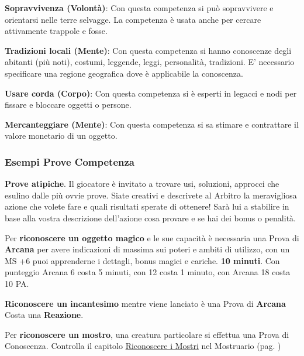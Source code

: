 \documentclass[12pt,a4paper,twoside,openany]{book}
\begin{document}
\begin{multicols}{2}
\textbf{Sopravvivenza (Volontà)}: Con questa competenza si può sopravvivere e orientarsi nelle terre selvagge. La competenza è usata anche per cercare attivamente trappole e fosse.

\textbf{Tradizioni locali (Mente)}: Con questa competenza si hanno conoscenze degli abitanti (più noti), costumi, leggende, leggi, personalità, tradizioni. E' necessario specificare una regione geografica dove è applicabile la conoscenza. 

\textbf{Usare corda (Corpo)}: Con questa competenza si è esperti in legacci e nodi per fissare e bloccare oggetti o persone. 

\textbf{Mercanteggiare (Mente)}: Con questa competenza si sa stimare e contrattare il valore monetario di un oggetto.

\subsubsection{Esempi Prove Competenza}\label{esempiprovecompetenza}\hypertarget{esempiprovecompetenze}{}

\textbf{Prove atipiche}. Il giocatore è invitato a trovare usi, soluzioni, approcci che esulino dalle più ovvie prove. Siate creativi e descrivete al Arbitro la meravigliosa azione che volete fare e quali risultati sperate di ottenere! Sarà lui a stabilire in base alla vostra descrizione dell'azione cosa provare e se hai dei bonus o penalità.

\medskip

Per \textbf{riconoscere un oggetto magico} e le sue capacità è necessaria una Prova di \textbf{Arcana} per avere indicazioni di massima sui poteri e ambiti di utilizzo, con un MS +6 puoi apprenderne i dettagli, bonus magici e cariche. \textbf{10 minuti}. Con punteggio Arcana 6 costa 5 minuti, con 12 costa 1 minuto, con Arcana 18 costa 10 PA.

\medskip

\textbf{Riconoscere un incantesimo} mentre viene lanciato è una Prova di \textbf{Arcana} Costa una \textbf{Reazione}.
\medskip

Per \textbf{riconoscere un mostro}, una creatura particolare si effettua una Prova di Conoscenza. Controlla il capitolo \hyperlink{riconoscereimostri}{Riconoscere i Mostri} nel Mostruario (pag. \pageref{riconoscereimostri})

\medskip


\end{multicols}
\end{document}

